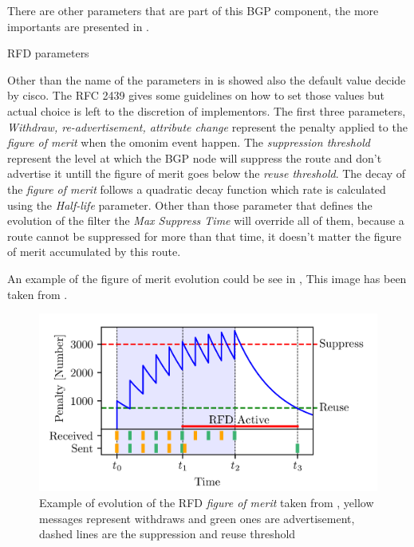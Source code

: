 There are other parameters that are part of this \ac{BGP} component, the more 
importants are presented in .

\begin{table}[h]
	
	\caption{\ac{RFD} parameters}
	\label{tbl:rfd_defaults}
\end{table}

Other than the name of the parameters in  is showed also
the default value decide by cisco.
The \ac{RFC} \num{2439} \cite{rfc2439} gives some guidelines on how to set those
values but actual choice is left to the discretion of implementors.
The first three parameters, \textit{Withdraw, re-advertisement, attribute change}
represent the penalty applied to the \textit{figure of merit} when the omonim event
happen.
The \textit{suppression threshold} represent the level at which the \ac{BGP} node will
suppress the route and don't advertise it untill the figure of merit goes
below the \textit{reuse threshold}.
The decay of the \textit{figure of merit} follows a quadratic decay function
which rate is calculated using the \textit{Half-life} parameter.
Other than those parameter that defines the evolution of the filter the
\textit{Max Suppress Time} will override all of them, because a route cannot
be suppressed for more than that time, it doesn't matter the figure of merit
accumulated by this route.

An example of the figure of merit evolution could be see in ,
This image has been taken from \cite{gray2020bgp}.

\begin{figure}[h]
    \centering
    \includegraphics[scale=0.22]{images/RFD/evolution.png}
	\caption{Example of evolution of the \ac{RFD} \textit{figure of merit} taken 
	from \cite{gray2020bgp}, yellow messages represent withdraws and green ones
	are advertisement, dashed lines are the suppression and reuse threshold}
    \label{fig:figure_of_merit}
\end{figure}

